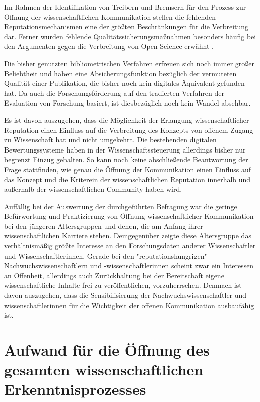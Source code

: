 Im Rahmen der Identifikation von Treibern und Bremsern für den Prozess zur Öffnung der wissenschaftlichen Kommunikation stellen die fehlenden Reputationsmechanismen eine der größten Beschränkungen für die Verbreitung dar. Ferner wurden fehlende Qualitätssicherungsmaßnahmen besonders häufig bei den Argumenten gegen die Verbreitung von Open Science erwähnt \cite{European_Commission_2015b}.

Die bisher genutzten bibliometrischen Verfahren erfreuen sich noch immer großer Beliebtheit und haben eine Absicherungsfunktion bezüglich der vermuteten Qualität einer Publikation, die bisher noch kein digitales Äquivalent gefunden hat. Da auch die Forschungsförderung auf den tradierten Verfahren der Evaluation von Forschung basiert, ist diesbezüglich noch kein Wandel absehbar.

Es ist davon auszugehen, dass die Möglichkeit der Erlangung wissenschaftlicher Reputation einen Einfluss auf die Verbreitung des Konzepts von offenem Zugang zu Wissenschaft hat und nicht umgekehrt. Die bestehenden digitalen Bewertungssysteme haben in der Wissenschaftssteuerung allerdings bisher nur begrenzt Einzug gehalten. So kann noch keine abschließende Beantwortung der Frage stattfinden, wie genau die Öffnung der Kommunikation einen Einfluss auf das Konzept und die Kriterein der wissenschaftlichen Reputation innerhalb und außerhalb der wissenschaftlichen Community haben wird.

Auffällig bei der Auswertung der durchgeführten Befragung war die geringe Befürwortung und Praktizierung von Öffnung wissenschaftlicher Kommunikation bei den jüngeren Altersgruppen und denen, die am Anfang ihrer wissenschaftlichen Karriere stehen. Demgegenüber zeigte diese Altersgruppe das verhältnismäßig größte Interesse an den Forschungsdaten anderer Wissenschaftler und Wissenschaftlerinnen. Gerade bei den "reputationshungrigen" Nachwuchswissenschaftlern und -wissenschaftlerinnen scheint zwar ein Interessen an Offenheit, allerdings auch Zurückhaltung bei der Bereitschaft eigene wissenschaftliche Inhalte frei zu veröffentlichen, vorzuherrschen. Demnach ist davon auszugehen, dass die Sensibilisierung der Nachwuchswissenschaftler und -wissenschaftlerinnen für die Wichtigkeit der offenen Kommunikation ausbaufähig ist.

\section{Aufwand für die Öffnung des gesamten wissenschaftlichen Erkenntnisprozesses}

